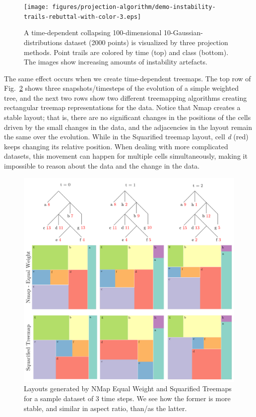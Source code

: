 \begin{figure}[h]
    \centering
    \texttt{[image: figures/projection-algorithm/demo-instability-trails-rebuttal-with-color-3.eps]}
    \caption{A time-dependent collapsing 100-dimensional 10-Gaussian-distributions dataset (2000 points) is visualized by three projection methods. Point trails are colored by time (top) and class (bottom). The images show increasing amounts of instability artefacts.}
    \label{fig:intro-pj-demo-instability}
\end{figure}

The same effect occurs when we create time-dependent treemaps. The top row of Fig.~\ref{fig:intro-tm-demo-instability} shows three snapshots/timesteps of the evolution of a simple weighted tree, and the next two rows show two different treemapping algorithms creating rectangular treemap representations for the data.
Notice that Nmap creates a stable layout; that is, there are no significant changes in the positions of the cells driven by the small changes in the data, and the adjacencies in the layout remain the same over the evolution.
While in the Squarified treemap layout, cell \emph{d} (red) keeps changing its relative position. When dealing with more complicated datasets, this movement can happen for multiple cells simultaneously, making it impossible to reason about the data and the change in the data.

\begin{figure}[h]
    \centering
    \includegraphics[width=\linewidth]{figures/intro/mov_sub_new.png}
    \caption{Layouts generated by NMap Equal Weight and Squarified Treemaps for a sample dataset
    of 3 time steps. We see how the former is more stable, and similar in aspect ratio, than/as the
    latter.}
    \label{fig:intro-tm-demo-instability}
\end{figure}

